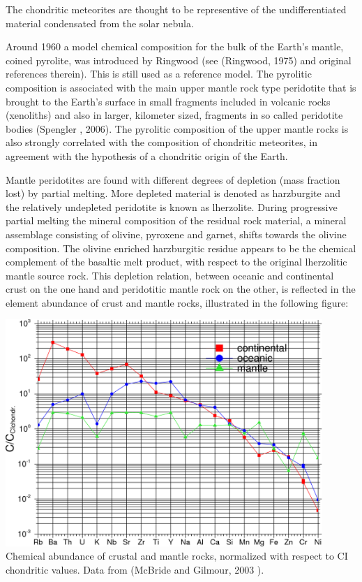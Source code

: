 The chondritic meteorites are thought to be representive
of the undifferentiated material condensated from the solar nebula.

Around 1960 a model chemical composition for the bulk of the Earth's
mantle, coined pyrolite,
was introduced by Ringwood (see (Ringwood, 1975) and original references
therein).
This is still used as a reference model.
The pyrolitic composition is associated with the main upper mantle rock type
peridotite that is brought to the Earth's surface in small fragments
included in volcanic rocks (xenoliths) and also in larger,
kilometer sized, fragments in so called peridotite bodies
(Spengler \etal, 2006).
The pyrolitic composition of the upper mantle rocks is also strongly
correlated with the composition of chondritic meteorites,
in agreement with the hypothesis of a chondritic origin of the Earth.

Mantle peridotites are found with different degrees of depletion 
(mass fraction lost) by partial melting.
More depleted material is denoted as harzburgite and the relatively 
undepleted peridotite is known as lherzolite.
During progressive partial melting the mineral composition of the residual
rock material, a mineral assemblage consisting of olivine, pyroxene and
garnet, shifts towards the olivine composition.
The olivine enriched harzburgitic residue appears to be the chemical
complement of the basaltic melt product, with respect to the original
lherzolitic mantle source rock.
This depletion relation, between oceanic and continental crust on the one
hand and peridotitic mantle rock on the other,
is reflected in the element abundance of crust and mantle rocks, 
illustrated in the following figure:

\begin{center}
\includegraphics[width=12cm]{images/gravity/abund}\\
{\captionfont 
Chemical abundance of crustal and mantle rocks,
normalized with respect to CI chondritic values.
Data from (McBride and Gilmour, 2003 \cite{mcgi03}).
}
\end{center}

